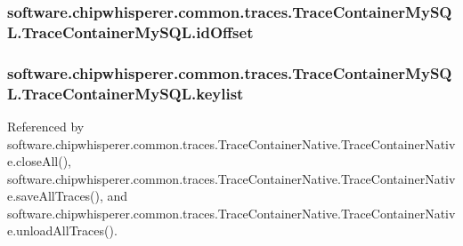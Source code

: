 \subsubsection[{id\+Offset}]{\setlength{\rightskip}{0pt plus 5cm}software.\+chipwhisperer.\+common.\+traces.\+Trace\+Container\+My\+S\+Q\+L.\+Trace\+Container\+My\+S\+Q\+L.\+id\+Offset}\label{classsoftware_1_1chipwhisperer_1_1common_1_1traces_1_1TraceContainerMySQL_1_1TraceContainerMySQL_a0b19385a395aaf937742d5a5fa6ab313}
\hypertarget{classsoftware_1_1chipwhisperer_1_1common_1_1traces_1_1TraceContainerMySQL_1_1TraceContainerMySQL_a14c863c1d489ddefd6b979599764a3e6}{}
\subsubsection[{keylist}]{\setlength{\rightskip}{0pt plus 5cm}software.\+chipwhisperer.\+common.\+traces.\+Trace\+Container\+My\+S\+Q\+L.\+Trace\+Container\+My\+S\+Q\+L.\+keylist}\label{classsoftware_1_1chipwhisperer_1_1common_1_1traces_1_1TraceContainerMySQL_1_1TraceContainerMySQL_a14c863c1d489ddefd6b979599764a3e6}


Referenced by software.\+chipwhisperer.\+common.\+traces.\+Trace\+Container\+Native.\+Trace\+Container\+Native.\+close\+All(), software.\+chipwhisperer.\+common.\+traces.\+Trace\+Container\+Native.\+Trace\+Container\+Native.\+save\+All\+Traces(), and software.\+chipwhisperer.\+common.\+traces.\+Trace\+Container\+Native.\+Trace\+Container\+Native.\+unload\+All\+Traces().

\hypertarget{classsoftware_1_1chipwhisperer_1_1common_1_1traces_1_1TraceContainerMySQL_1_1TraceContainerMySQL_aa0eeddac3722b946a789e2f20c0ccb44}{}
